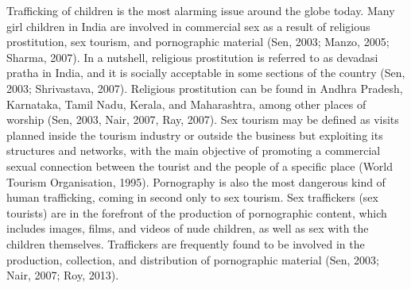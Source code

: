 \begin{multicols}{2}
\noi
Trafficking of children is the most alarming issue around the globe today. Many girl
children in India are involved in commercial sex as a result of religious prostitution,
sex tourism, and pornographic material (Sen, 2003; Manzo, 2005; Sharma, 2007). In a
nutshell, religious prostitution is referred to as devadasi pratha in India, and it is socially
acceptable in some sections of the country (Sen, 2003; Shrivastava, 2007). Religious
prostitution can be found in Andhra Pradesh, Karnataka, Tamil Nadu, Kerala, and
Maharashtra, among other places of worship (Sen, 2003, Nair, 2007, Ray, 2007). Sex
tourism may be defined as visits planned inside the tourism industry or outside the
business but exploiting its structures and networks, with the main objective of
promoting a commercial sexual connection between the tourist and the people of a
specific place (World Tourism Organisation, 1995). Pornography is also the most
dangerous kind of human trafficking, coming in second only to sex tourism. Sex
traffickers (sex tourists) are in the forefront of the production of pornographic content,
which includes images, films, and videos of nude children, as well as sex with the
children themselves. Traffickers are frequently found to be involved in the production,
collection, and distribution of pornographic material (Sen, 2003; Nair, 2007; Roy,
2013).


\end{multicols}
